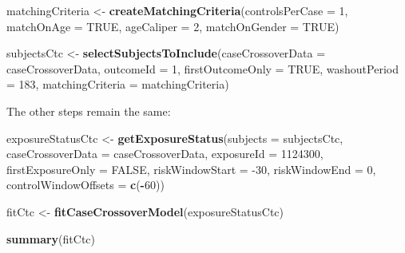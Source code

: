 \documentclass[]{article}
\newenvironment{Shaded}{\begin{snugshade}}{\end{snugshade}}
\newcommand{\DataTypeTok}[1]{\textcolor[rgb]{0.13,0.29,0.53}{#1}}
\newcommand{\DecValTok}[1]{\textcolor[rgb]{0.00,0.00,0.81}{#1}}
\newcommand{\KeywordTok}[1]{\textcolor[rgb]{0.13,0.29,0.53}{\textbf{#1}}}
\newcommand{\NormalTok}[1]{#1}
\newcommand{\OperatorTok}[1]{\textcolor[rgb]{0.81,0.36,0.00}{\textbf{#1}}}
\newcommand{\OtherTok}[1]{\textcolor[rgb]{0.56,0.35,0.01}{#1}}
\newcommand{\StringTok}[1]{\textcolor[rgb]{0.31,0.60,0.02}{#1}}
\begin{document}
\begin{Shaded}
\begin{Highlighting}[]
\NormalTok{matchingCriteria <-}\StringTok{ }\KeywordTok{createMatchingCriteria}\NormalTok{(}\DataTypeTok{controlsPerCase =} \DecValTok{1}\NormalTok{,}
                                           \DataTypeTok{matchOnAge =} \OtherTok{TRUE}\NormalTok{,}
                                           \DataTypeTok{ageCaliper =} \DecValTok{2}\NormalTok{,}
                                           \DataTypeTok{matchOnGender =} \OtherTok{TRUE}\NormalTok{)}

\NormalTok{subjectsCtc <-}\StringTok{ }\KeywordTok{selectSubjectsToInclude}\NormalTok{(}\DataTypeTok{caseCrossoverData =}\NormalTok{ caseCrossoverData,}
                                       \DataTypeTok{outcomeId =} \DecValTok{1}\NormalTok{,}
                                       \DataTypeTok{firstOutcomeOnly =} \OtherTok{TRUE}\NormalTok{,}
                                       \DataTypeTok{washoutPeriod =} \DecValTok{183}\NormalTok{,}
                                       \DataTypeTok{matchingCriteria =}\NormalTok{ matchingCriteria)}
\end{Highlighting}
\end{Shaded}

The other steps remain the same:

\begin{Shaded}
\begin{Highlighting}[]
\NormalTok{exposureStatusCtc <-}\StringTok{ }\KeywordTok{getExposureStatus}\NormalTok{(}\DataTypeTok{subjects =}\NormalTok{ subjectsCtc,}
                                       \DataTypeTok{caseCrossoverData =}\NormalTok{ caseCrossoverData,}
                                       \DataTypeTok{exposureId =} \DecValTok{1124300}\NormalTok{,}
                                       \DataTypeTok{firstExposureOnly =} \OtherTok{FALSE}\NormalTok{,}
                                       \DataTypeTok{riskWindowStart =} \DecValTok{-30}\NormalTok{,}
                                       \DataTypeTok{riskWindowEnd =} \DecValTok{0}\NormalTok{,}
                                       \DataTypeTok{controlWindowOffsets =} \KeywordTok{c}\NormalTok{(}\OperatorTok{-}\DecValTok{60}\NormalTok{))}

\NormalTok{fitCtc <-}\StringTok{ }\KeywordTok{fitCaseCrossoverModel}\NormalTok{(exposureStatusCtc)}

\KeywordTok{summary}\NormalTok{(fitCtc)}
\end{Highlighting}
\end{Shaded}
\end{document}
